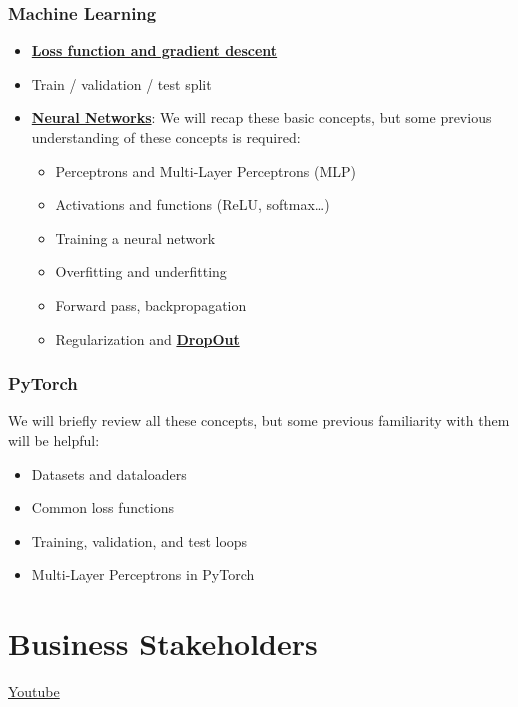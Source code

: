 \subsubsection{Machine Learning}

\begin{itemize}
    \item \href{https://machinelearningmastery.com/gradient-descent-for-machine-learning/}{\textbf{Loss function and gradient descent}}
    \item Train / validation / test split
    \item \href{https://machinelearningmastery.com/neural-networks-crash-course/}{\textbf{Neural Networks}}: We will recap these basic concepts, but some previous understanding of these concepts is required:

\begin{itemize}
        \item Perceptrons and Multi-Layer Perceptrons (MLP)
        \item Activations and functions (ReLU, softmax…)
        \item Training a neural network
        \item Overfitting and underfitting
        \item Forward pass, backpropagation
        \item Regularization and \href{https://machinelearningmastery.com/dropout-for-regularizing-deep-neural-networks/}{\textbf{DropOut}}
\end{itemize}

\end{itemize}

\subsubsection{PyTorch}

We will briefly review all these concepts, but some previous familiarity with them will be helpful:

\begin{itemize}
    \item Datasets and dataloaders
    \item Common loss functions
    \item Training, validation, and test loops
    \item Multi-Layer Perceptrons in PyTorch
\end{itemize}

\section{Business Stakeholders}
\href{https://www.youtube.com/watch?v=JrCeIxzb2Fs&ab_channel=Udacity}{Youtube} \newline

